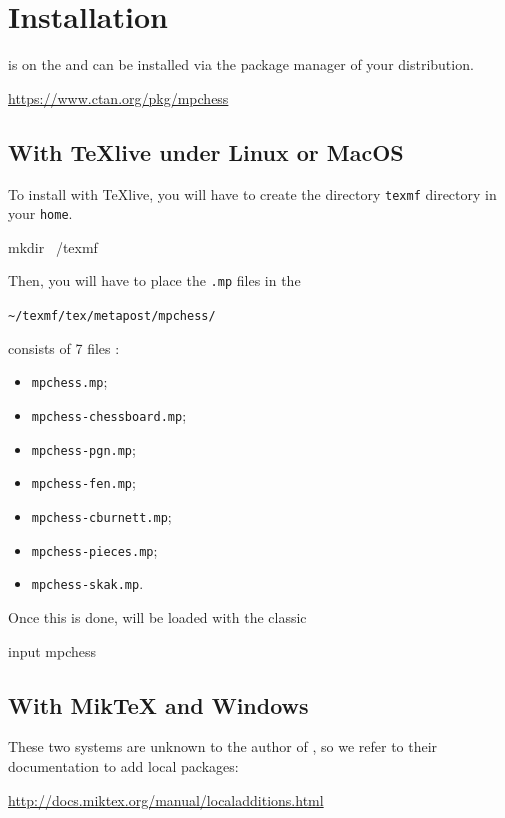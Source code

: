\documentclass[english]{ltxdoc}
\begin{document}
\section{Installation}

\mpchess is on the \ctan{} and can be installed via the package manager of your
distribution.

\begin{center}
  \url{https://www.ctan.org/pkg/mpchess}
\end{center}


\subsection{With \TeX live under Linux or MacOS}

To install \mpchess with \TeX live, you will have to create the directory
\lstinline+texmf+ directory in your \lstinline+home+. 

\begin{commandshell}
mkdir ~/texmf
\end{commandshell}

Then, you will have to place the \lstinline+.mp+ files in the 
\begin{center}
  \lstinline+~/texmf/tex/metapost/mpchess/+
\end{center}

\mpchess consists of 7 files  :
\begin{itemize}
  \item \verb+mpchess.mp+;
  \item \verb+mpchess-chessboard.mp+;
  \item \verb+mpchess-pgn.mp+;
  \item \verb+mpchess-fen.mp+;
  \item \verb+mpchess-cburnett.mp+;
  \item \verb+mpchess-pieces.mp+;
  \item \verb+mpchess-skak.mp+.
\end{itemize}

Once this is done, \mpchess will be loaded with the classic
\begin{mpcode}
input mpchess
\end{mpcode}

\subsection{With Mik\TeX{} and Windows}

These two systems are unknown to the author of \mpchess, so we refer to their documentation to add local packages:
\begin{center}
  \url{http://docs.miktex.org/manual/localadditions.html}
\end{center}
\end{document}

